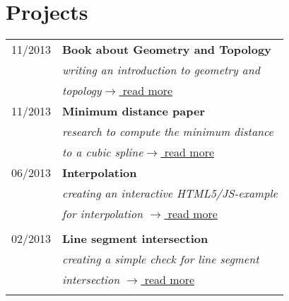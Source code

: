 \documentclass[a4paper,10pt]{article} %
\begin{document}
{\begin{minipage}[t]{0.5\textwidth}
\end{minipage} %
\hfill
\begin{minipage}[t]{0.44\textwidth} 
\vspace{0pt} %


\section{Projects} 

\begin{tabular}{rl}
11/2013  & \textbf{Book about Geometry and Topology}\\
& \textit{writing an introduction to geometry and}\\
& \textit{topology}\hfill \href{http://martin-thoma.com/geotopo/}{$\rightarrow$ read more}\\

11/2013	 & \textbf{Minimum distance paper}\\
& \textit{research to compute the minimum distance}\\
& \textit{to a cubic spline}\hfill \href{https://github.com/MartinThoma/LaTeX-examples/tree/master/documents/math-minimal-distance-to-cubic-function}{$\rightarrow$ read more}\\

06/2013	 & \textbf{Interpolation}\\
& \textit{creating an interactive HTML5/JS-example}\\
& \textit{for interpolation} \hfill \href{http://martin-thoma.com/polynomial-interpolation/}{$\rightarrow$ read more} \\\\

02/2013	 & \textbf{Line segment intersection}\\
& \textit{creating a simple check for line segment}\\
& \textit{intersection} \hfill \href{http://martin-thoma.com/how-to-check-if-two-line-segments-intersect/}{$\rightarrow$ read more} \\\\


\end{tabular}
\end{minipage}}
\end{document}
